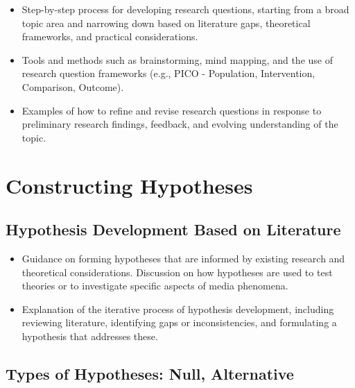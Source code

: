 \documentclass[
]{book}
\begin{document}
\begin{itemize}
\item
  Step-by-step process for developing research questions, starting from a broad topic area and narrowing down based on literature gaps, theoretical frameworks, and practical considerations.
\item
  Tools and methods such as brainstorming, mind mapping, and the use of research question frameworks (e.g., PICO - Population, Intervention, Comparison, Outcome).
\item
  Examples of how to refine and revise research questions in response to preliminary research findings, feedback, and evolving understanding of the topic.
\end{itemize}

\hypertarget{constructing-hypotheses}{%
\section*{Constructing Hypotheses}\label{constructing-hypotheses}}

\hypertarget{hypothesis-development-based-on-literature}{%
\subsection*{Hypothesis Development Based on Literature}\label{hypothesis-development-based-on-literature}}

\begin{itemize}
\item
  Guidance on forming hypotheses that are informed by existing research and theoretical considerations. Discussion on how hypotheses are used to test theories or to investigate specific aspects of media phenomena.
\item
  Explanation of the iterative process of hypothesis development, including reviewing literature, identifying gaps or inconsistencies, and formulating a hypothesis that addresses these.
\end{itemize}

\hypertarget{types-of-hypotheses-null-alternative}{%
\subsection*{Types of Hypotheses: Null, Alternative}\label{types-of-hypotheses-null-alternative}}
\end{document}
